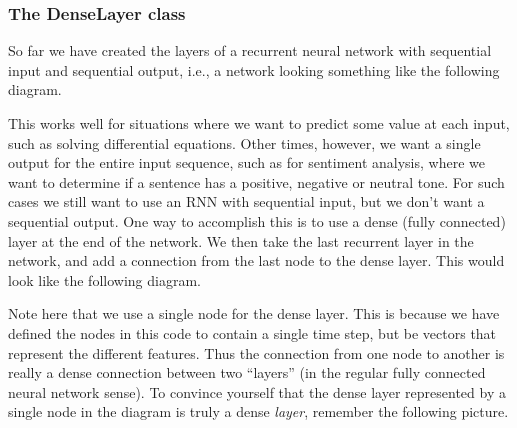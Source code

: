 \documentclass[11pt]{article}
\begin{document}
    \subsubsection{The DenseLayer class}\label{the-denselayer-class}

    So far we have created the layers of a recurrent neural network with
sequential input and sequential output, i.e., a network looking
something like the following diagram.

    

    This works well for situations where we want to predict some value at
each input, such as solving differential equations. Other times,
however, we want a single output for the entire input sequence, such as
for sentiment analysis, where we want to determine if a sentence has a
positive, negative or neutral tone. For such cases we still want to use
an RNN with sequential input, but we don't want a sequential output. One
way to accomplish this is to use a dense (fully connected) layer at the
end of the network. We then take the last recurrent layer in the
network, and add a connection from the last node to the dense layer.
This would look like the following diagram.

    

    Note here that we use a single node for the dense layer. This is because
we have defined the nodes in this code to contain a single time step,
but be vectors that represent the different features. Thus the
connection from one node to another is really a dense connection between
two ``layers'' (in the regular fully connected neural network sense). To
convince yourself that the dense layer represented by a single node in
the diagram is truly a dense \emph{layer}, remember the following
picture.

    
\end{document}
